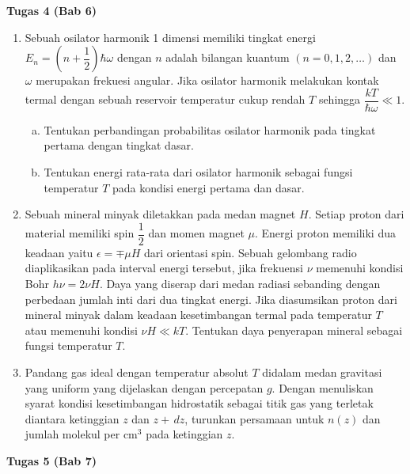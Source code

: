 \textbf{Tugas 4 (Bab 6)}
\begin{enumerate}
    \item Sebuah osilator harmonik 1 dimensi memiliki tingkat energi $E_n=(n+\dfrac{1}{2})\hbar\omega$ dengan $n$ adalah bilangan kuantum $(n=0, 1, 2,\dots)$ dan $\omega$ merupakan frekuesi angular. Jika osilator harmonik melakukan kontak termal dengan sebuah reservoir temperatur cukup rendah $T$ sehingga $\dfrac{kT}{\hbar\omega}\ll1$.
    \begin{enumerate}[(a)]
        \item Tentukan perbandingan probabilitas osilator harmonik pada tingkat pertama dengan tingkat dasar.
        \item Tentukan energi rata-rata dari osilator harmonik sebagai fungsi temperatur $T$ pada kondisi energi pertama dan dasar.
    \end{enumerate}
    \item Sebuah mineral minyak diletakkan pada medan magnet $H$. Setiap proton dari material memiliki spin $\dfrac{1}{2}$ dan momen magnet $\mu$. Energi proton memiliki dua keadaan yaitu $\epsilon=\mp\mu H$ dari orientasi spin. Sebuah gelombang radio diaplikasikan pada interval energi tersebut, jika frekuensi $\nu$ memenuhi kondisi Bohr $h\nu =2\nu H$. Daya yang diserap dari medan radiasi sebanding dengan perbedaan jumlah inti dari dua tingkat energi. Jika diasumsikan proton dari mineral minyak dalam keadaan kesetimbangan termal pada temperatur $T$ atau memenuhi kondisi $\nu H\ll kT$. Tentukan daya penyerapan mineral sebagai fungsi temperatur $T$.
    \item Pandang gas ideal dengan temperatur absolut $T$ didalam medan gravitasi yang uniform yang dijelaskan dengan percepatan $g$. Dengan menuliskan syarat kondisi kesetimbangan hidrostatik sebagai titik gas yang terletak diantara ketinggian $z$ dan $z+\,dz$, turunkan persamaan untuk $n(z)$ dan jumlah molekul per cm$^3$ pada ketinggian $z$. 
\end{enumerate}
\textbf{Tugas 5 (Bab 7)}
